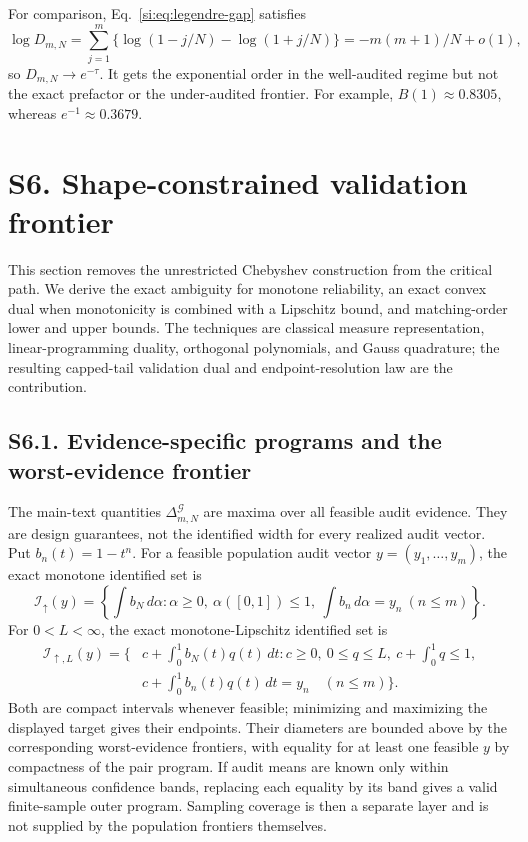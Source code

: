 \documentclass[10pt,twocolumn]{article}
\begin{document}
For comparison, Eq.~\ref{si:eq:legendre-gap} satisfies
\begin{equation}
\log D_{m,N}
=\sum_{j=1}^m\{\log(1-j/N)-\log(1+j/N)\}
=-m(m+1)/N+o(1),
\label{si:eq:legendre-phase}
\end{equation}
so $D_{m,N}\to e^{-\tau}$. It gets the exponential order in the well-audited regime but not the exact prefactor or the under-audited frontier. For example, $B(1)\approx0.8305$, whereas $e^{-1}\approx0.3679$.

\section*{S6. Shape-constrained validation frontier}

This section removes the unrestricted Chebyshev construction from the critical path. We derive the exact ambiguity for monotone reliability, an exact convex dual when monotonicity is combined with a Lipschitz bound, and matching-order lower and upper bounds. The techniques are classical measure representation, linear-programming duality, orthogonal polynomials, and Gauss quadrature; the resulting capped-tail validation dual and endpoint-resolution law are the contribution.

\subsection*{S6.1. Evidence-specific programs and the worst-evidence frontier}

The main-text quantities $\Delta^{\mathcal G}_{m,N}$ are maxima over all
feasible audit evidence. They are design guarantees, not the identified width
for every realized audit vector. Put $b_n(t)=1-t^n$. For a feasible population
audit vector $y=(y_1,\ldots,y_m)$, the exact monotone identified set is
\begin{equation}
\mathcal I_\uparrow(y)
=\left\{\int b_N\,d\alpha:
\alpha\ge0,\ \alpha([0,1])\le1,\
\int b_n\,d\alpha=y_n\ (n\le m)\right\}.
\label{si:eq:evidence-monotone-program}
\end{equation}
For $0<L<\infty$, the exact monotone-Lipschitz identified set is
\begin{align}
\mathcal I_{\uparrow,L}(y)
=\bigg\{&c+\int_0^1b_N(t)q(t)\,dt:
c\ge0,\ 0\le q\le L,\ c+\int_0^1q\le1,\nonumber\\
&c+\int_0^1b_n(t)q(t)\,dt=y_n\quad(n\le m)\bigg\}.
\label{si:eq:evidence-lipschitz-program}
\end{align}
Both are compact intervals whenever feasible; minimizing and maximizing the
displayed target gives their endpoints. Their diameters are bounded above by
the corresponding worst-evidence frontiers, with equality for at least one
feasible $y$ by compactness of the pair program. If audit means are known only
within simultaneous confidence bands, replacing each equality by its band
gives a valid finite-sample outer program. Sampling coverage is then a separate
layer and is not supplied by the population frontiers themselves.
\end{document}
